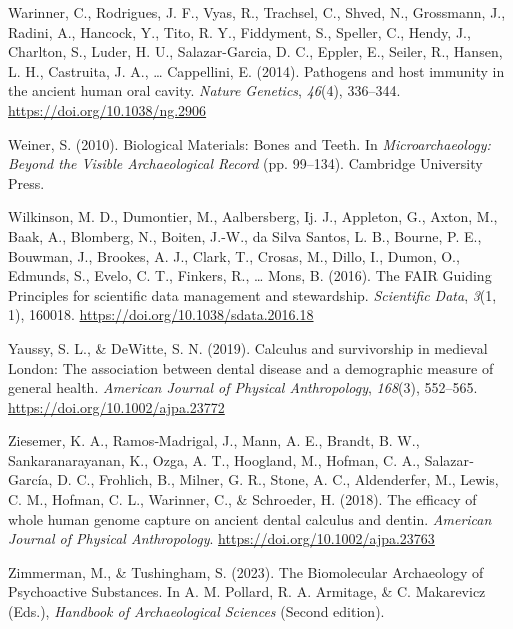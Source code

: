 \documentclass[
  letterpaper,
]{book}
\newlength{\cslhangindent}
\newlength{\cslentryspacingunit} %
\newenvironment{CSLReferences}[2] %
 {%
  \setlength{\parindent}{0pt}
  \ifodd #1
  \let\oldpar\par
  \def\par{\hangindent=\cslhangindent\oldpar}
  \fi
  \setlength{\parskip}{#2\cslentryspacingunit}
 }%
 {}
\begin{document}
\begin{CSLReferences}{1}{0}
\leavevmode{}%
Warinner, C., Rodrigues, J. F., Vyas, R., Trachsel, C., Shved, N.,
Grossmann, J., Radini, A., Hancock, Y., Tito, R. Y., Fiddyment, S.,
Speller, C., Hendy, J., Charlton, S., Luder, H. U., Salazar-Garcia, D.
C., Eppler, E., Seiler, R., Hansen, L. H., Castruita, J. A., \ldots{}
Cappellini, E. (2014). Pathogens and host immunity in the ancient human
oral cavity. \emph{Nature Genetics}, \emph{46}(4), 336--344.
\url{https://doi.org/10.1038/ng.2906}

\leavevmode{}%
Weiner, S. (2010). Biological {Materials}: {Bones} and {Teeth}. In
\emph{Microarchaeology: {Beyond} the {Visible Archaeological Record}}
(pp. 99--134). {Cambridge University Press}.

\leavevmode{}%
Wilkinson, M. D., Dumontier, M., Aalbersberg, Ij. J., Appleton, G.,
Axton, M., Baak, A., Blomberg, N., Boiten, J.-W., da Silva Santos, L.
B., Bourne, P. E., Bouwman, J., Brookes, A. J., Clark, T., Crosas, M.,
Dillo, I., Dumon, O., Edmunds, S., Evelo, C. T., Finkers, R., \ldots{}
Mons, B. (2016). The {FAIR Guiding Principles} for scientific data
management and stewardship. \emph{Scientific Data}, \emph{3}(1, 1),
160018. \url{https://doi.org/10.1038/sdata.2016.18}

\leavevmode{}%
Yaussy, S. L., \& DeWitte, S. N. (2019). Calculus and survivorship in
medieval {London}: {The} association between dental disease and a
demographic measure of general health. \emph{American Journal of
Physical Anthropology}, \emph{168}(3), 552--565.
\url{https://doi.org/10.1002/ajpa.23772}

\leavevmode{}%
Ziesemer, K. A., Ramos‐Madrigal, J., Mann, A. E., Brandt, B. W.,
Sankaranarayanan, K., Ozga, A. T., Hoogland, M., Hofman, C. A.,
Salazar‐García, D. C., Frohlich, B., Milner, G. R., Stone, A. C.,
Aldenderfer, M., Lewis, C. M., Hofman, C. L., Warinner, C., \&
Schroeder, H. (2018). The efficacy of whole human genome capture on
ancient dental calculus and dentin. \emph{American Journal of Physical
Anthropology}. \url{https://doi.org/10.1002/ajpa.23763}

\leavevmode{}%
Zimmerman, M., \& Tushingham, S. (2023). The {Biomolecular Archaeology}
of {Psychoactive Substances}. In A. M. Pollard, R. A. Armitage, \& C.
Makarevicz (Eds.), \emph{Handbook of {Archaeological Sciences}} (Second
edition).

\end{CSLReferences}
\end{document}
